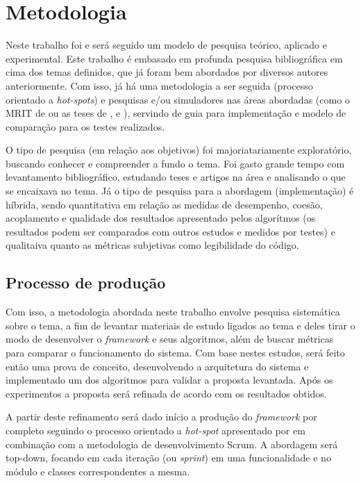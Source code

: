 \chapter[Metodologia]{Metodologia}

Neste trabalho foi e será seguido um modelo de pesquisa teórico, aplicado e experimental. Este trabalho é embasado em profunda pesquisa bibliográfica em cima dos temas definidos, que já foram bem abordados por diversos autores anteriormente. Com isso, já há uma metodologia a ser seguida (processo orientado a \textit{hot-spots}) e pesquisas e/ou simuladores nas áreas abordadas (como o MRIT de \cite{Guzman2008} ou as teses de \cite{Souza2008}, \cite{Thomsen2010} e \cite{Strandberg2004}), servindo de guia para implementação e modelo de comparação para os testes realizados.

O tipo de pesquisa (em relação aos objetivos) foi majoriatariamente exploratório, buscando conhecer e compreender a fundo o tema. Foi gasto grande tempo com levantamento bibliográfico, estudando teses e artigos na área e analisando o que se encaixava no tema. Já o tipo de pesquisa para a abordagem (implementação) é híbrida, sendo quantitativa em relação as medidas de desempenho, coesão, acoplamento e qualidade dos resultados apresentado pelos algorítmos (os resultados podem ser comparados com outros estudos e medidos por testes) e qualitaiva quanto as métricas subjetivas como legibilidade do código.

\section{Processo de produção}

Com isso, a metodologia abordada neste trabalho envolve pesquisa sistemática sobre o tema, a fim de levantar materiais de estudo ligados ao tema e deles tirar o modo de desenvolver o \textit{framework} e seus algoritmos, além de buscar métricas para comparar o funcionamento do sistema. Com base nestes estudos, será feito então uma prova de conceito, desenvolvendo a arquitetura do sistema e implementado um dos algoritmos para validar a proposta levantada. Após os experimentos a proposta será refinada de acordo com os resultados obtidos.

A partir deste refinamento será dado início a produção do \textit{framework} por completo seguindo o processo orientado a \textit{hot-spot} apresentado por \cite{Fayad1999} em combinação com a metodologia de desenvolvimento Scrum. A abordagem será top-down, focando em cada iteração (ou \textit{sprint}) em uma funcionalidade e no módulo e classes correspondentes a mesma. 

